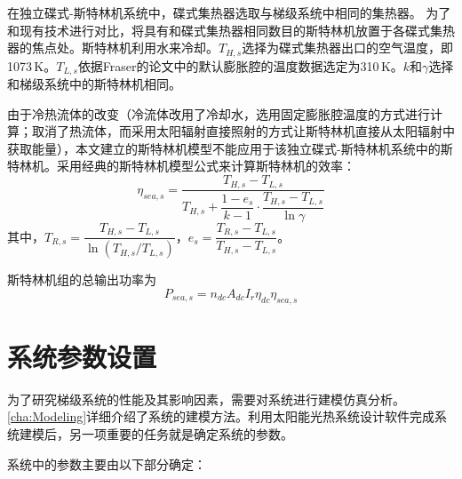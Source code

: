 在独立碟式-斯特林机系统中，碟式集热器选取与梯级系统中相同的集热器。
为了和现有技术进行对比，将具有和碟式集热器相同数目的斯特林机放置于各碟式集热器的焦点处。斯特林机利用水来冷却。$T_{H,s}$选择为碟式集热器出口的空气温度，即1073$\,\mathrm{K}$。$T_{L,s}$依据Fraser的论文\cite{Fraser2008}中的默认膨胀腔的温度数据选定为310$\,\mathrm{K}$。$k$和$\gamma$选择和梯级系统中的斯特林机相同。

由于冷热流体的改变（冷流体改用了冷却水，选用固定膨胀腔温度的方式进行计算；取消了热流体，而采用太阳辐射直接照射的方式让斯特林机直接从太阳辐射中获取能量），本文建立的斯特林机模型不能应用于该独立碟式-斯特林机系统中的斯特林机。采用经典的斯特林机模型公式来计算斯特林机的效率\cite{Stine1998}：
\begin{equation}
	\eta_{sea,s}=\dfrac{T_{H,s}-T_{L,s}}{T_{H,s}+\dfrac{1-e_{s}}{k-1}\cdot\dfrac{T_{H,s}-T_{L,s}}{\ln\gamma}}
\end{equation}
其中，$T_{R,s}=\dfrac{T_{H,s}-T_{L,s}}{\ln(T_{H,s}/T_{L,s})}$，$e_{s}=\dfrac{T_{R,s}-T_{L,s}}{T_{H,s}-T_{L,s}}$。

斯特林机组的总输出功率为
\begin{equation}
	P_{sea,s}=n_{dc}A_{dc}I_r\eta_{dc}\eta_{sea,s}
\end{equation}

\section{系统参数设置}

为了研究梯级系统的性能及其影响因素，需要对系统进行建模仿真分析。\autoref{cha:Modeling}详细介绍了系统的建模方法。利用太阳能光热系统设计软件完成系统建模后，另一项重要的任务就是确定系统的参数。

系统中的参数主要由以下部分确定：

